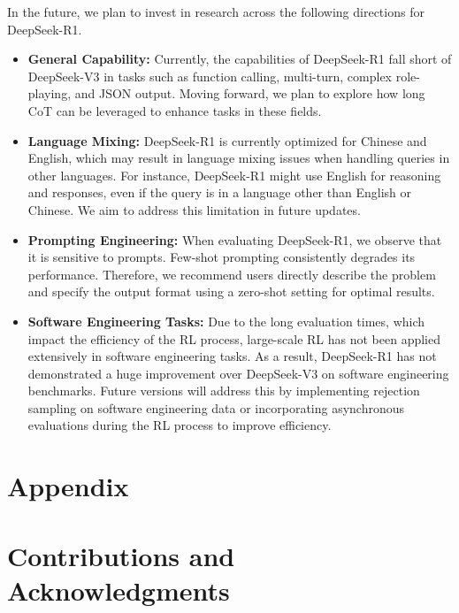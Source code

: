 \documentclass[11pt, a4paper, logo, copyright, nonumbering]{deepseek}
\newcommand{\dsri}{DeepSeek-R1}
\begin{document}
In the future, we plan to invest in research across the following directions for \dsri{}.
\begin{itemize}[topsep=0pt]
    \item \textbf{General Capability:}
  Currently, the capabilities of \dsri{} fall short of DeepSeek-V3 in tasks such as function calling, multi-turn, complex role-playing, and JSON output. Moving forward, we plan to explore how long CoT can be leveraged to enhance tasks in these fields.
    \item \textbf{Language Mixing:}
\dsri{} is currently optimized for Chinese and English, which may result in language mixing issues when handling queries in other languages. For instance, \dsri{} might use English for reasoning and responses, even if the query is in a language other than English or Chinese. We aim to address this limitation in future updates.
 \item \textbf{Prompting Engineering:} When evaluating \dsri{}, we observe that it is sensitive to prompts. Few-shot prompting consistently degrades its performance. Therefore, we recommend users directly describe the problem and specify the output format using a zero-shot setting for optimal results.
\item  \textbf{Software Engineering Tasks:}
Due to the long evaluation times, which impact the efficiency of the RL process, large-scale RL has not been applied extensively in software engineering tasks. As a result, DeepSeek-R1 has not demonstrated a huge improvement over DeepSeek-V3 on software engineering benchmarks. Future versions will address this by implementing rejection sampling on software engineering data or incorporating asynchronous evaluations during the RL process to improve efficiency.
    
\end{itemize}



\newpage
\appendix

\section*{Appendix}

\section{Contributions and Acknowledgments}

\end{document}
